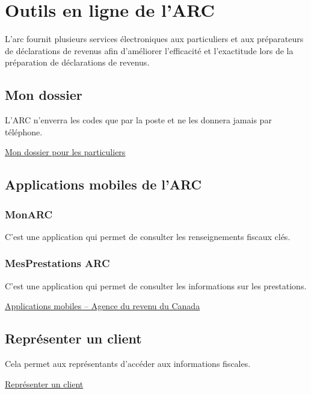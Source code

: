 \section{Outils en ligne de l'ARC}
\begin{intro}
	L'\acrshort{arc} fournit plusieurs services électroniques aux particuliers et aux préparateurs de déclarations de revenus afin d'améliorer l'efficacité et l'exactitude lors de la préparation de déclarations de revenus.
\end{intro}


\subsection{Mon dossier}
\begin{note}
	L'ARC n'enverra les codes que par la poste et ne les donnera jamais par téléphone.
\end{note}
\cat\href{https://www.canada.ca/fr/agence-revenu/services/services-electroniques/services-numeriques-particuliers/dossier-particuliers.html}{Mon dossier pour les particuliers}


\subsection{Applications mobiles de l'ARC}
\subsubsection{MonARC}
C'est une application qui permet de consulter les renseignements fiscaux clés.

\subsubsection{MesPrestations ARC}
C'est une application qui permet de consulter les informations sur les prestations.

\cat\href{https://www.canada.ca/fr/agence-revenu/services/services-electroniques/applications-mobiles-arc.html}{Applications mobiles – Agence du revenu du Canada}


\subsection{Représenter un client}
Cela permet aux représentants d'accéder aux informations fiscales.

\cat\href{https://www.canada.ca/fr/agence-revenu/services/services-electroniques/representer-client.html}{Représenter un client}


